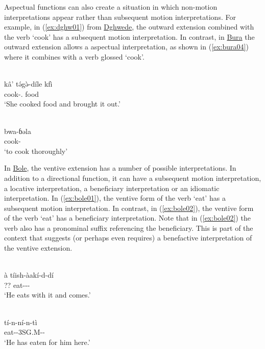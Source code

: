 Aspectual functions can also create a situation in which non-motion interpretations appear rather than subsequent motion interpretations. For example, in (\ref{ex:dghw01}) from \hyperref[dghw]{Dghwede}, the outward extension combined with the verb `cook' has a subsequent motion interpretation. In contrast, in \hyperref[bura]{Bura} the outward extension allows a aspectual interpretation, as shown in (\ref{ex:bura04}) where it combines with a verb glossed `cook'. 

\ea\label{ex:dghw01}
 \\
\gll kâ' tə́gə̀-díle kfì	\\
 cook-. food		\\
\glt `She cooked food and brought it out.'

\ex\label{ex:bura04}
 \\
\gll bwa-ɓəla	\\
cook-	\\
\glt `to cook thoroughly'
\z 

In \hyperref[bole]{Bole}, the ventive extension has a number of possible interpretations. In addition to a directional function, it can have a subsequent motion interpretation, a locative interpretation, a beneficiary interpretation or an idiomatic interpretation. In (\ref{ex:bole01}), the ventive form of the verb `eat' has a subsequent motion interpretation. In contrast, in (\ref{ex:bole02}), the ventive form of the verb `eat' has a beneficiary interpretation. Note that in (\ref{ex:bole02}) the verb also has a pronominal suffix referencing the beneficiary. This is part of the context that suggests (or perhaps even requires) a benefactive interpretation of the ventive extension. 

\ea\label{ex:bole01}
 \\
\gll à tíish-àakí-d-dí	\\
?? eat---	\\
\glt `He eats with it and comes.'

\ex\label{ex:bole02}
 \\
\gll tí-n-ní-n-tì	\\
eat--3SG.M--	\\
\glt `He has eaten for him here.'
\z 

